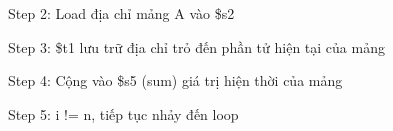 \documentclass[a4paper,12pt]{article}
\begin{document}
\begin{figure}[!h]
	\centerline{}
	\caption*{Step 2: Load địa chỉ mảng A vào \$s2}
	\label{fig:2s2}
\end{figure}
\begin{figure}[!h]
	\centerline{}
	\caption*{Step 3: \$t1 lưu trữ địa chỉ trỏ đến phần tử hiện tại của mảng}
	\label{fig:2s3}
\end{figure}
\begin{figure}[!h]
	\centerline{}
	\caption*{Step 4: Cộng vào \$s5 (sum) giá trị hiện thời của mảng}
	\label{fig:2s4}
\end{figure}
\begin{figure}[!h]
	\centerline{}
	\caption*{Step 5: i != n, tiếp tục nhảy đến loop}
	\label{fig:2s5}
\end{figure}
\end{document}

